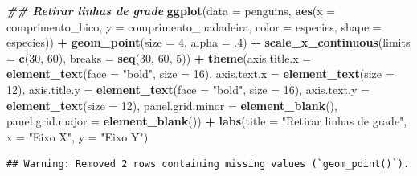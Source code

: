 \documentclass[
]{article}
\newenvironment{Shaded}{\begin{snugshade}}{\end{snugshade}}
\newcommand{\AttributeTok}[1]{\textcolor[rgb]{0.13,0.29,0.53}{#1}}
\newcommand{\DecValTok}[1]{\textcolor[rgb]{0.00,0.00,0.81}{#1}}
\newcommand{\DocumentationTok}[1]{\textcolor[rgb]{0.56,0.35,0.01}{\textbf{\textit{#1}}}}
\newcommand{\FunctionTok}[1]{\textcolor[rgb]{0.13,0.29,0.53}{\textbf{#1}}}
\newcommand{\NormalTok}[1]{#1}
\newcommand{\SpecialCharTok}[1]{\textcolor[rgb]{0.81,0.36,0.00}{\textbf{#1}}}
\newcommand{\StringTok}[1]{\textcolor[rgb]{0.31,0.60,0.02}{#1}}
\begin{document}
\begin{Shaded}
\begin{Highlighting}[]
\DocumentationTok{\#\# Retirar linhas de grade}
\FunctionTok{ggplot}\NormalTok{(}\AttributeTok{data =}\NormalTok{ penguins, }
       \FunctionTok{aes}\NormalTok{(}\AttributeTok{x =}\NormalTok{ comprimento\_bico, }\AttributeTok{y =}\NormalTok{ comprimento\_nadadeira,}
           \AttributeTok{color =}\NormalTok{ especies, }\AttributeTok{shape =}\NormalTok{ especies)) }\SpecialCharTok{+}
    \FunctionTok{geom\_point}\NormalTok{(}\AttributeTok{size =} \DecValTok{4}\NormalTok{, }\AttributeTok{alpha =}\NormalTok{ .}\DecValTok{4}\NormalTok{) }\SpecialCharTok{+}
    \FunctionTok{scale\_x\_continuous}\NormalTok{(}\AttributeTok{limits =} \FunctionTok{c}\NormalTok{(}\DecValTok{30}\NormalTok{, }\DecValTok{60}\NormalTok{), }\AttributeTok{breaks =} \FunctionTok{seq}\NormalTok{(}\DecValTok{30}\NormalTok{, }\DecValTok{60}\NormalTok{, }\DecValTok{5}\NormalTok{)) }\SpecialCharTok{+}
    \FunctionTok{theme}\NormalTok{(}\AttributeTok{axis.title.x =} \FunctionTok{element\_text}\NormalTok{(}\AttributeTok{face =} \StringTok{"bold"}\NormalTok{, }\AttributeTok{size =} \DecValTok{16}\NormalTok{),}
          \AttributeTok{axis.text.x =} \FunctionTok{element\_text}\NormalTok{(}\AttributeTok{size =} \DecValTok{12}\NormalTok{),}
          \AttributeTok{axis.title.y =} \FunctionTok{element\_text}\NormalTok{(}\AttributeTok{face =} \StringTok{"bold"}\NormalTok{, }\AttributeTok{size =} \DecValTok{16}\NormalTok{),}
          \AttributeTok{axis.text.y =} \FunctionTok{element\_text}\NormalTok{(}\AttributeTok{size =} \DecValTok{12}\NormalTok{),}
          \AttributeTok{panel.grid.minor =} \FunctionTok{element\_blank}\NormalTok{(),}
          \AttributeTok{panel.grid.major =} \FunctionTok{element\_blank}\NormalTok{()) }\SpecialCharTok{+}
    \FunctionTok{labs}\NormalTok{(}\AttributeTok{title =} \StringTok{"Retirar linhas de grade"}\NormalTok{, }\AttributeTok{x =} \StringTok{"Eixo X"}\NormalTok{, }\AttributeTok{y =} \StringTok{"Eixo Y"}\NormalTok{)}
\end{Highlighting}
\end{Shaded}

\begin{verbatim}
## Warning: Removed 2 rows containing missing values (`geom_point()`).
\end{verbatim}
\end{document}
